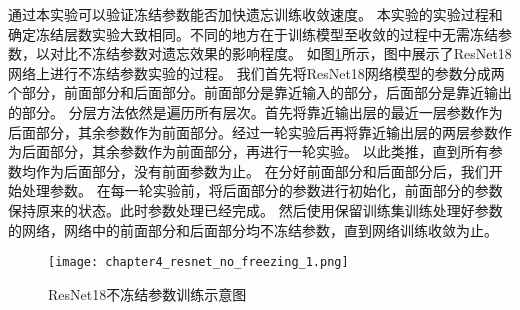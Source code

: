 通过本实验可以验证冻结参数能否加快遗忘训练收敛速度。
本实验的实验过程和确定冻结层数实验大致相同。不同的地方在于训练模型至收敛的过程中无需冻结参数，以对比不冻结参数对遗忘效果的影响程度。
如图\ref{fig:chapter4_resnet_no_freezing_1}所示，图中展示了ResNet18网络上进行不冻结参数实验的过程。
我们首先将ResNet18网络模型的参数分成两个部分，前面部分和后面部分。前面部分是靠近输入的部分，后面部分是靠近输出的部分。
分层方法依然是遍历所有层次。首先将靠近输出层的最近一层参数作为后面部分，其余参数作为前面部分。经过一轮实验后再将靠近输出层的两层参数作为后面部分，其余参数作为前面部分，再进行一轮实验。
以此类推，直到所有参数均作为后面部分，没有前面参数为止。
在分好前面部分和后面部分后，我们开始处理参数。
在每一轮实验前，将后面部分的参数进行初始化，前面部分的参数保持原来的状态。此时参数处理已经完成。
然后使用保留训练集训练处理好参数的网络，网络中的前面部分和后面部分均不冻结参数，直到网络训练收敛为止。
\begin{figure}
    \centering
    \texttt{[image: chapter4\_resnet\_no\_freezing\_1.png]}
    \caption{ResNet18不冻结参数训练示意图}
    \label{fig:chapter4_resnet_no_freezing_1}
\end{figure}

